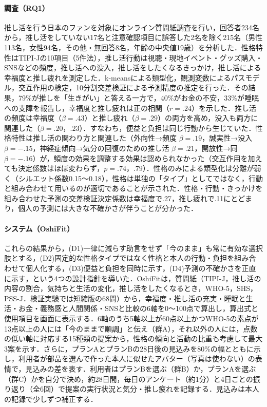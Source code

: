 \paragraph{調査（RQ1）}
推し活を行う日本のファンを対象にオンライン質問紙調査を行い，回答者234名から，推し活をしていない17名と注意確認項目に誤答した2名を除く215名（男性113名，女性94名，その他・無回答8名，年齢の中央値19歳）を分析した．性格特性はTIPI-Jの10項目（5件法），推し活行動は視聴・現地イベント・グッズ購入・SNSなどの頻度，推し活への没入，推し活をしたくなるきっかけ，推し活による幸福度と推し疲れを測定した．k-meansによる類型化，観測変数によるパスモデル，交互作用の検定，10分割交差検証による予測精度の推定を行った．その結果，79\%が推しを「生きがい」と答える一方で，40\%がお金の不安，33\%が睡眠への支障を報告し，幸福度と推し疲れは正の相関（$r=.24$）を示した．推し活の頻度は幸福度（$\beta=.43$）と推し疲れ（$\beta=.29$）の両方を高め，没入も両方に関連した（$\beta=.20$，$.23$）．すなわち，便益と負担は同じ行動から生じていた．性格特性は推し活の関わり方と関連した（外向性→頻度 $\beta=.19$，誠実性→没入 $\beta=-.15$，神経症傾向→気分の回復のための推し活 $\beta=.21$，開放性→同 $\beta=-.16$）が，頻度の効果を調整する効果は認められなかった（交互作用を加えても決定係数はほぼ変わらず，$p=.74$，$.79$）．性格のみによる類型化は分離が弱く（シルエット係数0.15〜0.18），性格は単独の「タイプ」としてではなく，行動と組み合わせて用いるのが適切であることが示された．性格・行動・きっかけを組み合わせた予測の交差検証決定係数は幸福度で.27，推し疲れで.11にとどまり，個人の予測には大きな不確かさが伴うことが分かった．

\paragraph{システム（OshiFit）}
これらの結果から，(D1)一律に減らす助言をせず「今のまま」も常に有効な選択肢とする，(D2)固定的な性格タイプではなく性格と本人の行動・負担を組み合わせて個人化する，(D3)便益と負担を同時に示す，(D4)予測の不確かさを正直に示す，という4つの設計指針を導いた．OshiFitは，質問紙（TIPI-J，推し活の内容の割合，気持ちと生活の変化，推し活をしたくなるとき，WHO-5，SHS，PSS-J．検証実験では短縮版の68問）から，幸福度・推し活の充実・睡眠と生活・お金・義務感と人間関係・SNSと比較の6軸を0〜100点で算出し，算出式と使用項目を画面に表示する．6軸のうち5軸以上が60点以上かつWHO-5の素点が13点以上の人には「今のままで順調」と伝え（群A），それ以外の人には，点数の低い軸に対応する15種類の提案から，性格の傾向と活動の比重も考慮して最大3案を示す．さらに，プランAとプランBの28日後の見込みを80\%の幅とともに示し，利用者が部品を選んで作った本人に似せたアバター（写真は使わない）の表情で，見込みの差を表す．利用者はプランBを選ぶ（群B）か，プランAを選ぶ（群C）かを自分で決め，約28日間，毎日のアンケート（約1分）と4日ごとの振り返り（全6回）で提案の実行状況と気分・推し疲れを記録する．見込みは本人の記録で少しずつ補正する．

